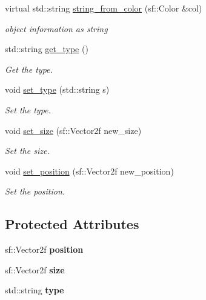 \begin{DoxyCompactItemize}
virtual std\+::string \hyperlink{classdrawable_add3d8569fe2616ae0ed503b19c92c08e}{string\+\_\+from\+\_\+color} (sf\+::\+Color \&col)
\begin{DoxyCompactList}\small\item\em object information as string \end{DoxyCompactList}\item 
std\+::string \hyperlink{classdrawable_a329e564296d591dc8bd2f6dc5a205213}{get\+\_\+type} ()
\begin{DoxyCompactList}\small\item\em Get the type. \end{DoxyCompactList}\item 
void \hyperlink{classdrawable_aa019787b726542ca470fb817251e7b09}{set\+\_\+type} (std\+::string s)
\begin{DoxyCompactList}\small\item\em Set the type. \end{DoxyCompactList}\item 
void \hyperlink{classdrawable_a34b6b50f342c41f550f09e0465f95f61}{set\+\_\+size} (sf\+::\+Vector2f new\+\_\+size)
\begin{DoxyCompactList}\small\item\em Set the size. \end{DoxyCompactList}\item 
void \hyperlink{classdrawable_a5e40f2621daaca4ac32ef26b8c01b9a6}{set\+\_\+position} (sf\+::\+Vector2f new\+\_\+position)
\begin{DoxyCompactList}\small\item\em Set the position. \end{DoxyCompactList}\end{DoxyCompactItemize}
\subsection*{Protected Attributes}
\begin{DoxyCompactItemize}
\item 
\mbox{\label{classdrawable_a34679fa5ae82eee65dfd6b1b9f3c7cb6}} 
sf\+::\+Vector2f {\bfseries position}
\item 
\mbox{\label{classdrawable_aa3900dd7b69b439a3514e6acdb4a17b9}} 
sf\+::\+Vector2f {\bfseries size}
\item 
\mbox{\label{classdrawable_ad5a982912d20a94b0e69de86cc9b53cb}} 
std\+::string {\bfseries type}
\end{DoxyCompactItemize}


